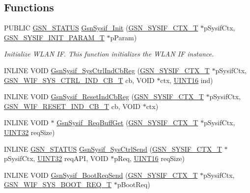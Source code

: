 \subsection*{Functions}
\begin{DoxyCompactItemize}
\item 
PUBLIC \hyperlink{a00660_gada5951904ac6110b1fa95e51a9ddc217}{GSN\_\-STATUS} \hyperlink{a00630_ga921cdc829cd7b875a0cb53c093c2b9da}{GsnSysif\_\-Init} (\hyperlink{a00261}{GSN\_\-SYSIF\_\-CTX\_\-T} $\ast$pSysifCtx, \hyperlink{a00262}{GSN\_\-SYSIF\_\-INIT\_\-PARAM\_\-T} $\ast$pParam)
\begin{DoxyCompactList}\small\item\em Initialize WLAN IF. This function initializes the WLAN IF instance. \end{DoxyCompactList}\item 
INLINE VOID \hyperlink{a00596_a29259f8bc461ad5bca207b2c73d64901}{GsnSysif\_\-SysCtrlIndCbReg} (\hyperlink{a00261}{GSN\_\-SYSIF\_\-CTX\_\-T} $\ast$pSysifCtx, \hyperlink{a00635_ga6079bd2ef0b375f3d1b987c9e3de8f6b}{GSN\_\-WIF\_\-SYS\_\-CTRL\_\-IND\_\-CB\_\-T} cb, VOID $\ast$ctx, \hyperlink{a00660_ga09f1a1fb2293e33483cc8d44aefb1eb1}{UINT16} ind)
\item 
INLINE VOID \hyperlink{a00596_a5a9542b5da9c86bc4ffe80d36563939a}{GsnSysif\_\-ResetIndCbReg} (\hyperlink{a00261}{GSN\_\-SYSIF\_\-CTX\_\-T} $\ast$pSysifCtx, \hyperlink{a00635_gad71afa8e03b517ec379abfa3cb39de92}{GSN\_\-WIF\_\-RESET\_\-IND\_\-CB\_\-T} cb, VOID $\ast$ctx)
\item 
INLINE VOID $\ast$ \hyperlink{a00596_a36cc1c60e30963385c20506a0cd73407}{GsnSysif\_\-ReqBuffGet} (\hyperlink{a00261}{GSN\_\-SYSIF\_\-CTX\_\-T} $\ast$pSysifCtx, \hyperlink{a00660_gae1e6edbbc26d6fbc71a90190d0266018}{UINT32} reqSize)
\item 
INLINE \hyperlink{a00660_gada5951904ac6110b1fa95e51a9ddc217}{GSN\_\-STATUS} \hyperlink{a00596_abe7d1a2842fda6d47a1f3b030f498a6b}{GsnSysif\_\-SysCtrlSend} (\hyperlink{a00261}{GSN\_\-SYSIF\_\-CTX\_\-T} $\ast$pSysifCtx, \hyperlink{a00660_gae1e6edbbc26d6fbc71a90190d0266018}{UINT32} reqAPI, VOID $\ast$pReq, \hyperlink{a00660_ga09f1a1fb2293e33483cc8d44aefb1eb1}{UINT16} reqSize)
\item 
INLINE VOID \hyperlink{a00596_a70b76dcc66c3351ffd68e5b4269764ea}{GsnSysif\_\-BootReqSend} (\hyperlink{a00261}{GSN\_\-SYSIF\_\-CTX\_\-T} $\ast$pSysifCtx, \hyperlink{a00348}{GSN\_\-WIF\_\-SYS\_\-BOOT\_\-REQ\_\-T} $\ast$pBootReq)
\end{DoxyCompactItemize}


